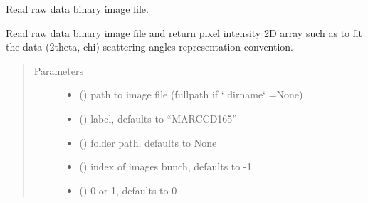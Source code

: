 \documentclass[letterpaper,10pt,english]{sphinxmanual}
\begin{document}
\begin{fulllineitems}
\label{\detokenize{PeakSearch:LaueTools.readmccd.readCCDimage}}
Read raw data binary image file.

Read raw data binary image file and return pixel intensity 2D array such as
to fit the data (2theta, chi) scattering angles representation convention.
\begin{quote}\begin{description}
\item[{Parameters}] \leavevmode\begin{itemize}
\item {} 
 () \textendash{} path to image file (fullpath if {}` dirname{}` =None)

\item {} 
 (\sphinxstyleliteralemphasis{\sphinxupquote{, }}) \textendash{} label, defaults to “MARCCD165”

\item {} 
 (\sphinxstyleliteralemphasis{\sphinxupquote{, }}) \textendash{} folder path, defaults to None

\item {} 
 (\sphinxstyleliteralemphasis{\sphinxupquote{, }}) \textendash{} index of images bunch, defaults to -1

\item {} 
 (\sphinxstyleliteralemphasis{\sphinxupquote{, }}) \textendash{} 0 or 1, defaults to 0


\end{itemize}
\end{description}
\end{quote}
\end{fulllineitems}
\end{document}
